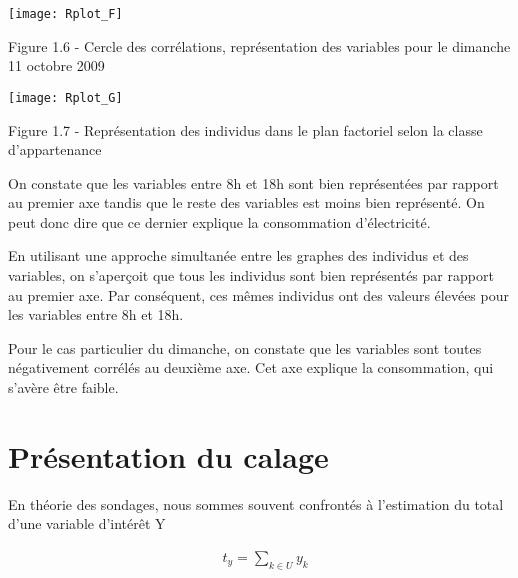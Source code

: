 \documentclass[11pt,fleqn]{book} %
\begin{document}
 \texttt{[image: Rplot\_F]}
 \begin{center} Figure 1.6 - Cercle des corrélations, représentation des variables pour le dimanche 11 octobre 2009 \end{center}

  \texttt{[image: Rplot\_G]}
 \begin{center} Figure 1.7 - Représentation des individus dans le plan factoriel selon la classe d'appartenance \end{center}
 
 \vspace{4em}
 
 On constate que les variables entre 8h et 18h sont bien représentées par rapport au premier axe tandis que le reste des variables est moins bien représenté. On peut donc dire que ce dernier explique la consommation d'électricité.
 
 \vspace{1em}
 
En utilisant une approche simultanée entre les graphes des individus et des variables, on s'aperçoit que tous les individus sont bien représentés par rapport au premier axe. Par conséquent, ces mêmes individus ont des valeurs élevées pour les variables entre 8h et 18h.
 
 \vspace{1em}
 
 Pour le cas particulier du dimanche, on constate que les variables sont toutes négativement corrélés au deuxième axe. Cet axe explique la consommation, qui s'avère être faible.
 
 
 



\chapter{Présentation du calage}


En théorie des sondages, nous sommes souvent confrontés à l'estimation du total d'une variable d'intérêt Y

\begin{align*}
&  t_{y}=\sum_{k\in U} y_k  
\end{align*}
\end{document}
